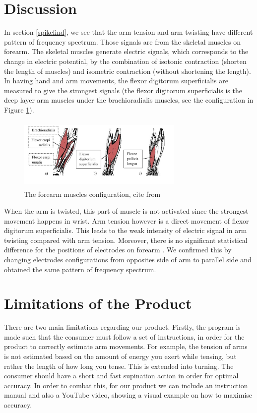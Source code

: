 \documentclass[oneside]{article}
\begin{document}
\section{Discussion}
In section \ref{spikefind}, we see that the arm tension and arm twisting have different pattern of frequency spectrum. Those signals are from the skeletal muscles on forearm. The skeletal muscles generate electric signals, which corresponds to the change in electric potential, by the combination of isotonic contraction (shorten the length of muscles) and isometric contraction (without shortening the length). In having hand and arm movements, the flexor digitorum superficialis are measured to give the strongest signals \cite{muscleResponse} (the flexor digitorum superficialis is the deep layer arm muscles under the  brachioradialis muscles, see the configuration in Figure \ref{arm}).
\begin{figure}[H]
  \centering
  \includegraphics[width = 8cm, height = 3.5cm]{Pictures/armMuscle.png}
  \caption{The forearm muscles configuration, cite from \cite{muscleResponse}}
  \label{arm}
\end{figure}
When the arm is twisted, this part of muscle is not activated since the strongest movement happens in wrist. Arm tension however is a direct movement of flexor digitorum superficialis. This leads to the weak intensity of electric signal in arm twisting compared with arm tension. Moreover, there is no significant statistical difference for the positions of electrodes on forearm \cite{muscleResponse}. We confirmed this by changing electrodes configurations from opposites side of arm to parallel side and obtained the same pattern of frequency spectrum.


\section{Limitations of the Product}

There are two main limitations regarding our product. Firstly, the program is made such that the consumer must follow a set of instructions, in order for the product to correctly estimate arm movements. For example, the tension of arms is not estimated based on the amount of energy you exert while tensing, but rather the length of how long you tense. This is extended into turning. The consumer should have a short and fast supination action in order for optimal accuracy. In order to combat this, for our product we can include an instruction manual and also a YouTube video, showing a visual example on how to maximise accuracy.
\end{document}
